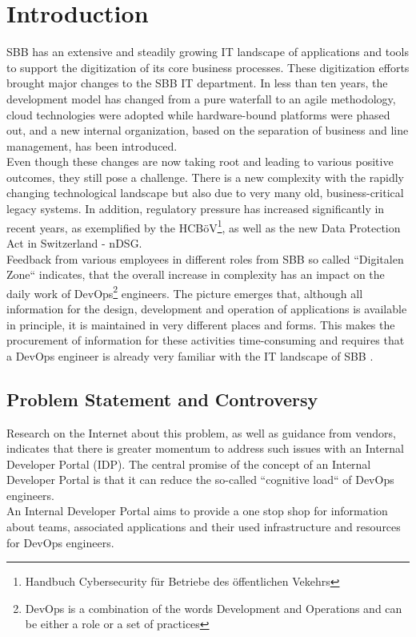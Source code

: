 \documentclass[a4paper,12pt]{article}
\begin{document}
    \section{Introduction}
    \label{sec:introduction}
    SBB has an extensive and steadily growing IT landscape of applications and tools to support the digitization of its
    core business processes.
    These digitization efforts brought major changes to the SBB IT department.
    In less than ten years, the development model has changed from a pure waterfall to an agile methodology,
    cloud technologies were adopted while hardware-bound platforms were phased out, and a new internal organization,
    based on the separation of business and line management, has been introduced.\\
    Even though these changes are now taking root and leading to various positive outcomes, they still pose a challenge.
    There is a new complexity with the rapidly changing technological landscape but also due to very many old,
    business-critical legacy systems.
    In addition, regulatory pressure has increased significantly in recent years, as exemplified by the
    HCBöV\footnote{Handbuch Cybersecurity für Betriebe des öffentlichen Vekehrs}, as well as the new Data Protection Act in Switzerland - nDSG.\\
    Feedback from various employees in different roles from SBB so called ``Digitalen Zone`` indicates, that the overall
    increase in complexity has an impact on the daily work of DevOps\footnote{DevOps is a combination of the words
    Development and Operations and can be either a role or a set of practices} engineers.
    The picture emerges that, although all information for the design, development and operation of
    applications is available in principle, it is maintained in very different places and forms.
    This makes the procurement of information for these activities time-consuming and requires that a DevOps
    engineer is already very familiar with the IT landscape of SBB .

    \subsection{Problem Statement and Controversy}
    \label{subsec:iproblemstatement}
    Research on the Internet about this problem, as well as guidance from vendors, indicates that there is greater momentum
    to address such issues with an Internal Developer Portal (IDP).
    The central promise of the concept of an Internal Developer Portal is that it can reduce the so-called
    ``cognitive load`` of DevOps engineers.\\
    An Internal Developer Portal aims to provide a one stop shop for information about teams, associated applications and
    their used infrastructure and resources for DevOps engineers.
\end{document}
